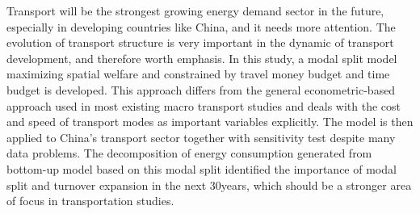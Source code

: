 Transport will be the strongest growing energy demand sector in the future, especially in developing countries like China, and it needs more attention. The evolution of transport structure is very important in the dynamic of transport development, and therefore worth emphasis. In this study, a modal split model maximizing spatial welfare and constrained by travel money budget and time budget is developed. This approach differs from the general econometric-based approach used in most existing macro transport studies and deals with the cost and speed of transport modes as important variables explicitly. The model is then applied to China's transport sector together with sensitivity test despite many data problems. The decomposition of energy consumption generated from bottom-up model based on this modal split identified the importance of modal split and turnover expansion in the next 30years, which should be a stronger area of focus in transportation studies.